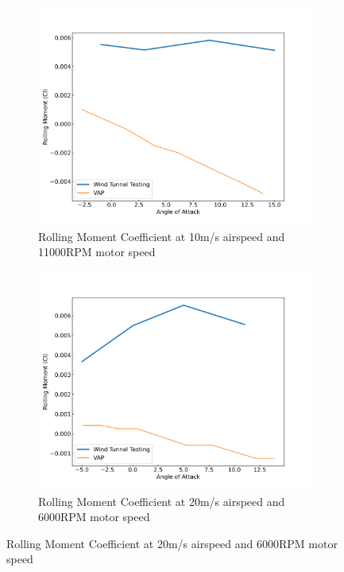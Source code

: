 \begin{figure}[H]
\begin{subfigure}[b]{0.467\textwidth}
        \includegraphics[width=\textwidth]{05_Results/VAP/noProp/Cl/10ms_11000RPM_Cl.png}
        \caption{Rolling Moment Coefficient at 10m/s airspeed and 11000RPM motor speed}
        \label{fig:VAP_NoProp_Cl_10ms_11000}
    \end{subfigure}
    \begin{subfigure}[b]{0.467\textwidth}
        \centering
        \includegraphics[width=\textwidth]{05_Results/VAP/noProp/Cl/20ms_6000RPM_Cl.png}
        \caption{Rolling Moment Coefficient at 20m/s airspeed and 6000RPM motor speed}
        \label{fig:VAP_NoProp_Cl_20ms_6000}
    \end{subfigure}

\end{figure}
